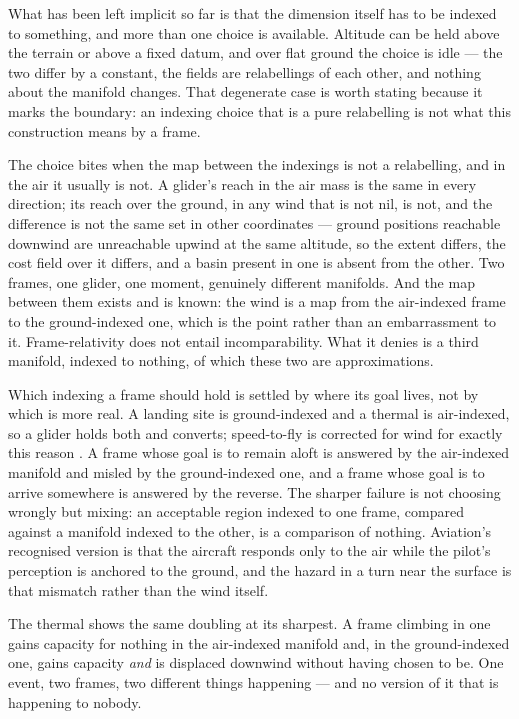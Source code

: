 \documentclass[11pt,a4paper]{article}
\theoremstyle{remark}
\begin{document}
What has been left implicit so far is that the dimension itself has to be indexed to something, and
more than one choice is available. Altitude can be held above the terrain or above a fixed datum, and
over flat ground the choice is idle --- the two differ by a constant, the fields are relabellings of
each other, and nothing about the manifold changes. That degenerate case is worth stating because it
marks the boundary: an indexing choice that is a pure relabelling is not what this construction means
by a frame.

The choice bites when the map between the indexings is not a relabelling, and in the air it usually
is not. A glider's reach in the air mass is the same in every direction; its reach over the ground,
in any wind that is not nil, is not, and the difference is not the same set in other coordinates --- ground positions
reachable downwind are unreachable upwind at the same altitude, so the extent differs, the cost field
over it differs, and a basin present in one is absent from the other. Two frames, one glider, one
moment, genuinely different manifolds. And the map between them exists and is known: the wind is a
map from the air-indexed frame to the ground-indexed one, which is the point rather than an
embarrassment to it. Frame-relativity does not entail incomparability. What it denies is a third
manifold, indexed to nothing, of which these two are approximations.

Which indexing a frame should hold is settled by where its goal lives, not by which is more real. A
landing site is ground-indexed and a thermal is air-indexed, so a glider holds both and converts;
speed-to-fly is corrected for wind for exactly this reason \citep{reichmann1978}. A frame whose goal
is to remain aloft is answered by the air-indexed manifold and misled by the ground-indexed one, and
a frame whose goal is to arrive somewhere is answered by the reverse. The sharper failure is not
choosing wrongly but mixing: an acceptable region indexed to one frame, compared against a manifold
indexed to the other, is a comparison of nothing. Aviation's recognised version is that the aircraft
responds only to the air while the pilot's perception is anchored to the ground, and the hazard in a
turn near the surface is that mismatch rather than the wind itself.

The thermal shows the same doubling at its sharpest. A frame climbing in one gains capacity for
nothing in the air-indexed manifold and, in the ground-indexed one, gains capacity \emph{and} is
displaced downwind without having chosen to be. One event, two frames, two different things
happening --- and no version of it that is happening to nobody.
\end{document}
